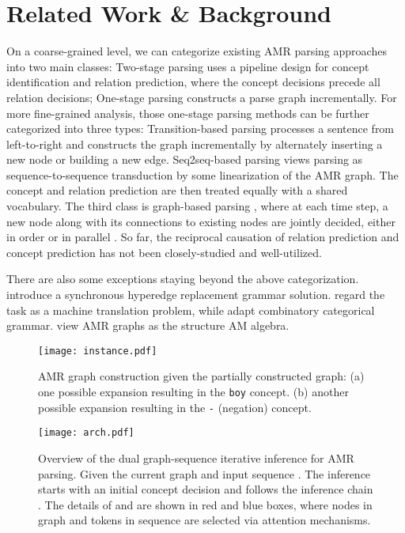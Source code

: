 \documentclass[11pt,a4paper]{article}
\begin{document}
	\section{Related Work \& Background}
	On a coarse-grained level, we can categorize existing AMR parsing approaches into two main classes: Two-stage parsing \cite{flanigan2014discriminative, lyu2018amr,zhang-etal-2019-amr} uses a pipeline design for concept identification and relation prediction, where the concept decisions precede all relation decisions; One-stage parsing constructs a parse graph incrementally. For more fine-grained analysis, those one-stage parsing methods can be further categorized into three types: Transition-based parsing \cite{wang2016camr,damonte2016incremental,ballesteros2017amr,peng-etal-2017-addressing,guo2018better,liu2018amr,wang2017getting,naseem-etal-2019-rewarding} processes a sentence from left-to-right and constructs the graph incrementally by alternately inserting a new node or building a new edge. Seq2seq-based parsing \cite{barzdins2016riga,konstas2017neural,van2017neural,peng-etal-2018-sequence} views parsing as sequence-to-sequence transduction by some linearization of the AMR graph. The concept and relation prediction are then treated equally with a shared vocabulary. The third class is graph-based parsing \cite{cai-lam-2019-core,zhang-etal-2019-broad}, where at each time step, a new node along with its connections to existing nodes are jointly decided, either in order \cite{cai-lam-2019-core} or in parallel \cite{zhang-etal-2019-broad}. So far, the reciprocal causation of relation prediction and concept prediction has not been closely-studied and well-utilized.
	
	There are also some exceptions staying beyond the above categorization.   introduce a synchronous hyperedge replacement grammar solution.  regard the task as a machine translation problem, while  adapt combinatory categorical grammar.  view AMR graphs as the structure AM algebra.
	\begin{figure}[t]
		\centering
		\texttt{[image: instance.pdf]}
		\caption{AMR graph construction given the partially constructed graph: (a) one possible expansion resulting in the \texttt{boy} concept. (b) another possible expansion resulting in the \texttt{-} (negation) concept.}
		\label{example}
	\end{figure}
	\begin{figure*}[t]
		\centering
		\texttt{[image: arch.pdf]}
		\caption{Overview of the dual graph-sequence iterative inference for AMR parsing. Given the current graph  and input sequence . The inference starts with an initial concept decision  and follows the inference chain . The details of  and  are shown in red and blue boxes, where nodes in graph and tokens in sequence are selected via attention mechanisms.}
		\label{arch}
	\end{figure*}
\end{document}

